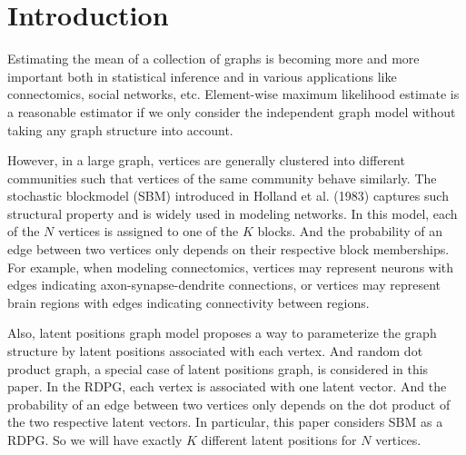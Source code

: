 \section{Introduction}

%
%

Estimating the mean of a collection of graphs is becoming more and more important both in statistical inference and in various applications like connectomics, social networks, etc.
Element-wise maximum likelihood estimate is a reasonable estimator if we only consider the independent graph model without taking any graph structure into account.

However, in a large graph, vertices are generally clustered into different communities such that vertices of the same community behave similarly. The stochastic blockmodel (SBM) introduced in Holland et al. (1983)  captures such structural property and is widely used in modeling networks. In this model, each of the $N$ vertices is assigned to one of the $K$ blocks. And the probability of an edge between two vertices only depends on their respective block memberships.
For example, when modeling connectomics, vertices may represent neurons with edges indicating axon-synapse-dendrite connections, or vertices may represent brain regions with edges indicating connectivity between regions.

Also, latent positions graph model proposes a way to parameterize the graph structure by latent positions associated with each vertex. And random dot product graph, a special case of latent positions graph, is considered in this paper. In the RDPG, each vertex is associated with one latent vector. And the probability of an edge between two vertices only depends on the dot product of the two respective latent vectors.
In particular, this paper considers SBM as a RDPG. So we will have exactly $K$ different latent positions for $N$ vertices.

